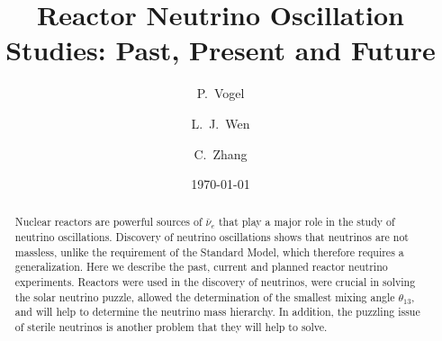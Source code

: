\documentclass[aps,twocolumn,preprintnumbers,amsmath,superscriptaddress,amssymb,floats,nofootinbib]{revtex4-1}
\begin{document}
\title{Reactor Neutrino Oscillation Studies: Past, Present and Future}
\date{\today}
\author{P.~Vogel}
\author{L.~J.~Wen}
\author{C.~Zhang}


\begin{abstract}
Nuclear reactors are powerful sources of $\bar{\nu}_e$ that play a major role in the study of neutrino oscillations. 
Discovery of neutrino oscillations shows that neutrinos are not massless, unlike the requirement of the Standard Model, which therefore requires a generalization.
Here we describe the past, current and planned reactor neutrino experiments.   
Reactors were used in the discovery of neutrinos, were crucial in solving the solar neutrino puzzle, allowed the determination of the smallest mixing angle $\theta_{13}$, and will help to determine the neutrino mass hierarchy.
In addition, the puzzling issue of sterile neutrinos is another problem that they will help to solve.
\end{abstract}

\maketitle
\thispagestyle{plain}








%


\end{document}
